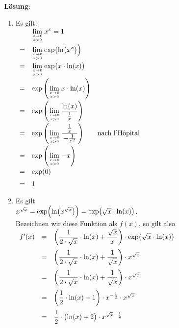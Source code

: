\documentclass{article}
\newcommand{\ds}{\displaystyle}
\newcommand{\solution}{\vspace*{0.2cm}

\noindent
\textbf{L\"osung}: }
\begin{document}
\solution
\begin{enumerate}
\item Es gilt:
      \\[0.2cm]
      \hspace*{1.3cm}
      $
      \begin{array}{cll}
        & \ds \lim\limits_{x\rightarrow 0 \atop x > 0} x^x = 1                            \\[0.4cm]
      = & \ds \lim\limits_{x\rightarrow 0 \atop x > 0} \exp\bigl(\ln\bigl(x^x\bigr)\Bigr) \\[0.4cm]
      = & \ds \lim\limits_{x\rightarrow 0 \atop x > 0} \exp\bigl(x \cdot \ln(x)\bigr)     \\[0.4cm]
      = & \ds \exp\left(\lim\limits_{x\rightarrow 0 \atop x > 0} x \cdot \ln(x)\right)     \\[0.4cm]
      = & \ds \exp\left(\lim\limits_{x\rightarrow 0 \atop x > 0} \frac{\ln(x)}{\,\frac{1}{x}\,}\right)     
          \\[0.4cm]
      = & \ds \exp\left(\lim\limits_{x\rightarrow 0 \atop x > 0} \frac{\frac{1}{x}}{\,-\frac{1}{x^2}\,}\right) &
          \mbox{nach l'Hôpital}\\[0.4cm]
      = & \ds \exp\left(\lim\limits_{x\rightarrow 0 \atop x > 0} -x\right) 
          \\[0.4cm]
      = & \exp(0) \\[0.2cm]
      = & 1    
      \end{array}
      $

\item Es gilt
      \\[0.2cm]
      \hspace*{1.3cm}
      $x^{\sqrt{x}} = \exp\Bigl(\ln\bigl(x^{\sqrt{x}}\bigr)\Bigr) = \exp\bigl(\sqrt{x} \cdot \ln(x)\bigr)$.
      \\[0.2cm]
      Bezeichnen wir diese Funktion als $f(x)$, so gilt also
      \\[0.2cm]
      \hspace*{1.3cm}
      $
      \begin{array}[t]{lcl} 
      f'(x) & = & \ds \left(\frac{1}{2\cdot\sqrt{x}} \cdot \ln(x) + \frac{\sqrt{x}}{x}\right) \cdot \exp\bigl(\sqrt{x} \cdot \ln(x)\bigr) 
                  \\[0.4cm]
            & = & \ds \left(\frac{1}{2\cdot\sqrt{x}} \cdot \ln(x) + \frac{1}{\sqrt{x}}\right) \cdot x^{\sqrt{x}}
                  \\[0.4cm]
            & = & \ds \left(\frac{1}{2\cdot\sqrt{x}} \cdot \ln(x) + \frac{1}{\sqrt{x}}\right) \cdot x^{\sqrt{x}}
                  \\[0.4cm]
            & = & \ds \left(\frac{1}{2} \cdot \ln(x) + 1\right) \cdot x^{-\frac{1}{2}} \cdot x^{\sqrt{x}}
                  \\[0.4cm]
            & = & \ds \frac{1}{2}\cdot\bigl(\ln(x) + 2\bigr)  \cdot  x^{\sqrt{x}- \frac{1}{2}}
                  \\[0.2cm]
      \end{array}
      $
      \\[0.2cm]

\end{enumerate}
\pagebreak
\end{document}
